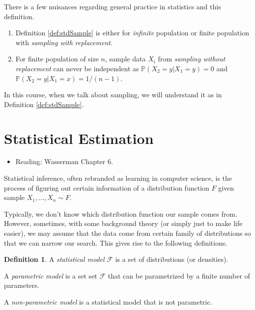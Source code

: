 \documentclass[
  openany]{book}
\providecommand{\tightlist}{%
  \setlength{\itemsep}{0pt}\setlength{\parskip}{0pt}}
\theoremstyle{definition}
\newtheorem{definition}{Definition}[chapter]
\theoremstyle{definition}
\theoremstyle{definition}
\theoremstyle{definition}
\theoremstyle{remark}
\begin{document}
There is a few nuisances regarding general practice in statistics and this definition.

\begin{enumerate}
\def\labelenumi{\arabic{enumi}.}
\item
  Definition \ref{def:stdSample} is either for \emph{infinite} population or finite population with \emph{sampling with replacement}.
\item
  For finite population of size \(n\), sample data \(X_i\) from \emph{sampling without replacement}
  can never be independent as
  \(\mathbb{P}(X_2 = y | X_1 = y) = 0\) and \(\mathbb{P}(X_2 = y | X_1 = x) = 1/(n-1)\).
\end{enumerate}

In this course, when we talk about sampling, we will understand it as in Definition \ref{def:stdSample}.

\section{Statistical Estimation}\label{statistical-estimation}

\begin{itemize}
\tightlist
\item
  Reading: Wasserman Chapter 6.
\end{itemize}

Statistical inference, often rebranded as learning in computer science, is the process
of figuring out certain information of a distribution function \(F\) given
sample \(X_1, \dots, X_n \sim F\).

Typically, we don't know which distribution function our sample comes from.
However, sometimes, with some background theory (or simply just to make life easier),
we may assume that the data come from certain family of distributions so that
we can narrow our search.
This gives rise to the following definitions.

\begin{definition}
A \emph{statistical model} \(\mathcal{F}\) is a set of distributions (or densities).

A \emph{parametric model} is a set set \(\mathcal{F}\) that can be parametrized
by a finite number of parameters.

A \emph{non-parametric model} is a statistical model that is not parametric.
\end{definition}
\end{document}

